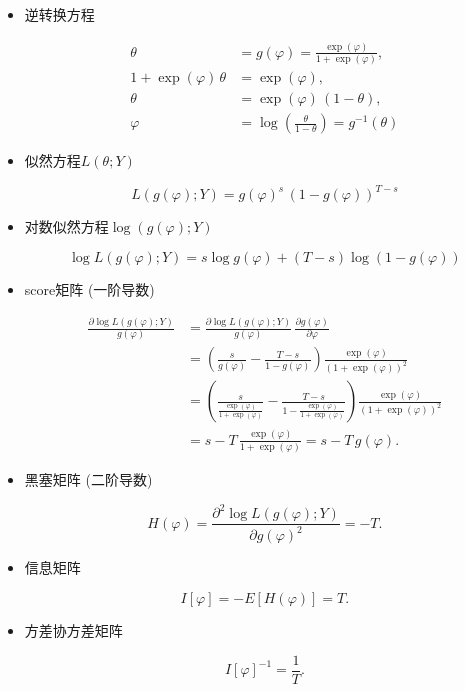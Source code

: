 \begin{itemize}
\tightlist
\item
  逆转换方程

  \begin{equation}
  \begin{split}
  \theta & = g(\varphi) = \frac{\exp(\varphi)}{1+\exp(\varphi)}, \\
  1+\exp(\varphi) \, \theta & = \exp(\varphi), \\
  \theta & = \exp(\varphi) \, (1 - \theta), \\
  \varphi & = \log \left( \frac{\theta}{1 - \theta} \right) = g^{-1}(\theta)
  \end{split}
  \end{equation}
\item
  似然方程\(L(\theta ; Y)\)

  \begin{equation}
  L(g(\varphi) ; Y) = g(\varphi)^{s} \, \left( 1 - g(\varphi) \right)^{T-s}
  \end{equation}
\item
  对数似然方程\(\log (g(\varphi) ; Y)\)

  \begin{equation}
  \log L(g(\varphi) ; Y) = s \log g(\varphi) + \left( T - s \right) \log \left( 1 - g(\varphi) \right)
  \end{equation}
\item
  score矩阵 (一阶导数)

  \begin{equation}
  \begin{split}
  \frac{
  \partial \log L(g(\varphi) ; Y)
  }{
  g(\varphi)
  }
  & = \frac{
  \partial \log L(g(\varphi) ; Y)
  }{
  g(\varphi)
  } \,
  \frac{\partial g(\varphi)}{\partial \varphi} \\
  & = \left(\frac{s}{g(\varphi)} - \frac{T-s}{1-g(\varphi)} \right)
  \frac{\exp(\varphi)}{\left( 1 + \exp(\varphi) \right)^{2}}\\
  & = \left(\frac{s}{ \frac{\exp(\varphi)}{1+\exp(\varphi)} } - \frac{T-s}{1-\frac{\exp(\varphi)}{1+\exp(\varphi)}} \right)
  \frac{\exp(\varphi)}{\left( 1 + \exp(\varphi) \right)^{2}} \\
  & = s - T \, \frac{\exp(\varphi)}{1+\exp(\varphi)} = s - T \, g(\varphi).
  \end{split}
  \end{equation}
\item
  黑塞矩阵 (二阶导数)

  \begin{equation}
  H(\varphi) = \frac{
  \partial^{2} \log L(g(\varphi) ; Y)
  }{
  \partial g(\varphi)^{2}
  } = - T.
  \end{equation}
\item
  信息矩阵

  \begin{equation}
  I[\varphi]  = - E [H(\varphi)] = T.
  \end{equation}
\item
  方差协方差矩阵

  \begin{equation}
  I[\varphi]^{-1} = \frac{1}{T}.
  \end{equation}
\end{itemize}

